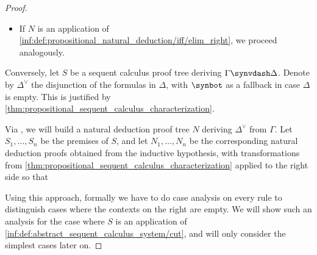 \begin{proof}
\begin{itemize}
\begin{equation*}
\begin{prooftree}
        \hypo{}
        \ellipsis {\( S_2 \)} { \Gamma \synvdash \psi }
        \infer1[\ref{inf:def:abstract_sequent_calculus_system/weak/right}]{ \Gamma \synvdash \varphi, \varphi, \psi }

        \infer2[\ref{inf:def:classical_propositional_sequent_calculus/iff/left}]{ (\varphi \syniff \psi), \Gamma \synvdash \varphi }

        \infer2[\ref{inf:def:abstract_sequent_calculus_system/cut}]{ \Gamma, \Gamma \synvdash \varphi }
        \infer1[\ref{inf:def:abstract_sequent_calculus_system/inter/left}*]{ \Gamma', \Gamma \synvdash \varphi }
        \infer1[\ref{inf:def:abstract_sequent_calculus_system/contr/left}*]{ \Gamma \synvdash \varphi }
      \end{prooftree}
    \end{equation*}

    Here \( \Gamma' \) is the reversed list of \( \Gamma \).

    \item If \( N \) is an application of \ref{inf:def:propositional_natural_deduction/iff/elim_right}, we proceed analogously.
  \end{itemize}

  \NecessitySubProof Conversely, let \( S \) be a sequent calculus proof tree deriving \( \Gamma \synvdash \Delta \). Denote by \( \Delta^\vee \) the disjunction of the formulas in \( \Delta \), with \( \synbot \) as a fallback in case \( \Delta \) is empty. This is justified by \cref{thm:propositional_sequent_calculus_characterization}.

  Via , we will build a natural deduction proof tree \( N \) deriving \( \Delta^\vee \) from \( \Gamma \). Let \( S_1, \ldots, S_n \) be the premises of \( S \), and let \( N_1, \ldots, N_n \) be the corresponding natural deduction proofs obtained from the inductive hypothesis, with transformations from \cref{thm:propositional_sequent_calculus_characterization} applied to the right side so that

  Using this approach, formally we have to do case analysis on every rule to distinguish cases where the contexts on the right are empty. We will show such an analysis for the case where \( S \) is an application of \ref{inf:def:abstract_sequent_calculus_system/cut}, and will only consider the simplest cases later on.


\end{proof}
